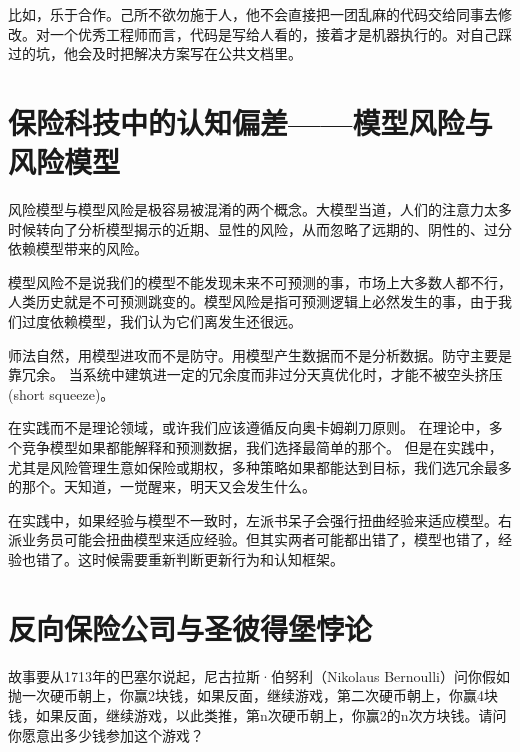 \documentclass[
  oneside]{book}
\begin{document}
比如，乐于合作。己所不欲勿施于人，他不会直接把一团乱麻的代码交给同事去修改。对一个优秀工程师而言，代码是写给人看的，接着才是机器执行的。对自己踩过的坑，他会及时把解决方案写在公共文档里。

\hypertarget{ux4fddux9669ux79d1ux6280ux4e2dux7684ux8ba4ux77e5ux504fux5deeux6a21ux578bux98ceux9669ux4e0eux98ceux9669ux6a21ux578b}{%
\chapter{保险科技中的认知偏差------模型风险与风险模型}\label{ux4fddux9669ux79d1ux6280ux4e2dux7684ux8ba4ux77e5ux504fux5deeux6a21ux578bux98ceux9669ux4e0eux98ceux9669ux6a21ux578b}}

风险模型与模型风险是极容易被混淆的两个概念。大模型当道，人们的注意力太多时候转向了分析模型揭示的近期、显性的风险，从而忽略了远期的、阴性的、过分依赖模型带来的风险。

模型风险不是说我们的模型不能发现未来不可预测的事，市场上大多数人都不行，人类历史就是不可预测跳变的。模型风险是指可预测逻辑上必然发生的事，由于我们过度依赖模型，我们认为它们离发生还很远。

师法自然，用模型进攻而不是防守。用模型产生数据而不是分析数据。防守主要是靠冗余。
当系统中建筑进一定的冗余度而非过分天真优化时，才能不被空头挤压(short squeeze)。

在实践而不是理论领域，或许我们应该遵循反向奥卡姆剃刀原则。
在理论中，多个竞争模型如果都能解释和预测数据，我们选择最简单的那个。
但是在实践中，尤其是风险管理生意如保险或期权，多种策略如果都能达到目标，我们选冗余最多的那个。天知道，一觉醒来，明天又会发生什么。

在实践中，如果经验与模型不一致时，左派书呆子会强行扭曲经验来适应模型。右派业务员可能会扭曲模型来适应经验。但其实两者可能都出错了，模型也错了，经验也错了。这时候需要重新判断更新行为和认知框架。

\hypertarget{ux53cdux5411ux4fddux9669ux516cux53f8ux4e0eux5723ux5f7cux5f97ux5821ux6096ux8bba}{%
\chapter{反向保险公司与圣彼得堡悖论}\label{ux53cdux5411ux4fddux9669ux516cux53f8ux4e0eux5723ux5f7cux5f97ux5821ux6096ux8bba}}

故事要从1713年的巴塞尔说起，尼古拉斯·伯努利（Nikolaus Bernoulli）问你假如抛一次硬币朝上，你赢2块钱，如果反面，继续游戏，第二次硬币朝上，你赢4块钱，如果反面，继续游戏，以此类推，第n次硬币朝上，你赢2的n次方块钱。请问你愿意出多少钱参加这个游戏？
\end{document}
